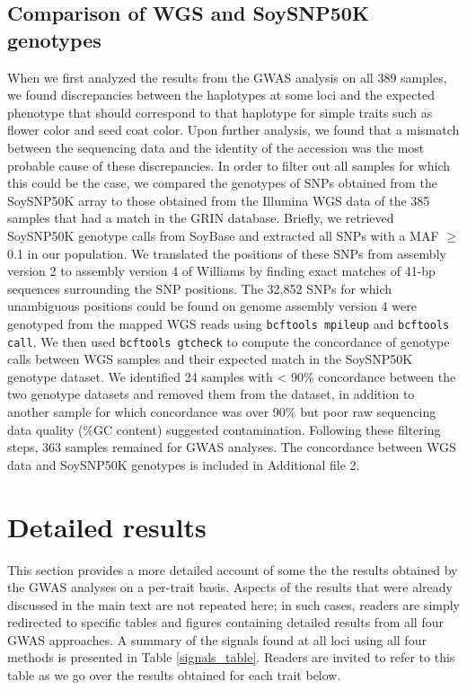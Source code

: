 \documentclass[12pt]{article}
\begin{document}
\subsection{Comparison of WGS and SoySNP50K genotypes}
\label{annexe-sv-gwas-soysnp50k}
When we first analyzed the results from the GWAS analysis on all 389 samples,
we found discrepancies between the haplotypes at some loci and the expected
phenotype that should correspond to that haplotype for simple traits such as
flower color and seed coat color. Upon further analysis, we found that a
mismatch between the sequencing data and the identity of the accession was the
most probable cause of these discrepancies. In order to filter out all samples
for which this could be the case, we compared the genotypes of SNPs obtained
from the SoySNP50K array \cite{song2013} to those obtained from the Illumina WGS
data of the 385 samples that had a match in the GRIN database. Briefly, we
retrieved SoySNP50K genotype calls from SoyBase \citep{grant2010} and extracted
all SNPs with a MAF $\geq$ 0.1 in our population. We translated the positions
of these SNPs from assembly version 2 to assembly version 4 of Williams by
finding exact matches of 41-bp sequences surrounding the SNP positions. The
32,852 SNPs for which unambiguous positions could be found on genome assembly
version 4 were genotyped from the mapped WGS reads using \texttt{bcftools
mpileup} and \texttt{bcftools call}. We then used \texttt{bcftools gtcheck} to
compute the concordance of genotype calls between WGS samples and their
expected match in the SoySNP50K genotype dataset.  We identified 24 samples
with < 90\% concordance between the two genotype datasets and removed them from
the dataset, in addition to another sample for which concordance was over 90\%
but poor raw sequencing data quality (\%GC content) suggested contamination.
Following these filtering steps, 363 samples remained for GWAS analyses. The
concordance between WGS data and SoySNP50K genotypes is included in
Additional file 2.

\section{Detailed results}
\label{annexe-sv-gwas-detailed-results}

This section provides a more detailed account of some the the results obtained
by the GWAS analyses on a per-trait basis. Aspects of the results that were
already discussed in the main text are not repeated here; in such cases,
readers are simply redirected to specific tables and figures containing
detailed results from all four GWAS approaches. A summary of the signals found
at all loci using all four methods is presented in Table \ref{signals_table}.
Readers are invited to refer to this table as we go over the results obtained
for each trait below.
\end{document}
